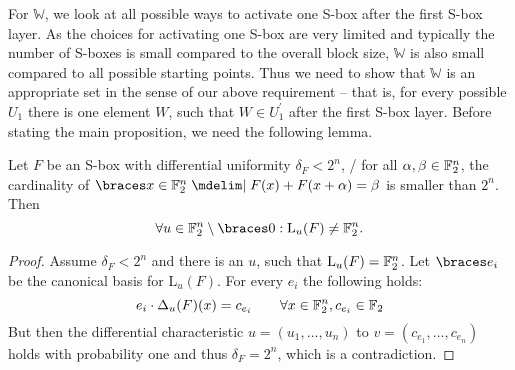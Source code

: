For $\mathbb{W}$, we look at all possible ways to activate one S-box after the first S-box layer.
As the choices for activating one S-box are very limited and typically the number of S-boxes is small compared to the overall block size, $\mathbb{W}$ is also small compared to all possible starting points.
Thus we need to show that $\mathbb{W}$ is an appropriate set in the sense of our above requirement -- that is, for every possible $U_1$ there is one element $W$, such that $W \in U_1^\prime$ after the first S-box layer.
Before stating the main proposition, we need the following lemma.
\begin{lemma}\label{st:lem:ls_dim}
    Let $F$ be an S-box with differential uniformity $\delta_F < 2^n$, \ie/ for all $\alpha, \beta \in \mathbb{F}_2^n$, the cardinality of $\set{x \in \F_2^n \given F(x) + F(x + \alpha) = \beta}$ is smaller than $2^n$.
    Then
    \begin{equation*}
        \forall u \in \F_2^n \setminus \set{0} : \mathrm{L}_u(F) \ne \F_2^n.
    \end{equation*}
\end{lemma}
\begin{proof}
    Assume $\delta_F < 2^n$ and there is an $u$, such that $\mathrm{L}_u(F) = \mathbb{F}_2^n$.
    Let $\set{e_i}$ be the canonical basis for $\mathrm{L}_u(F)$.
    For every $e_i$ the following holds:
    \begin{equation*}
        e_i \cdot \Delta_u(F)(x) = c_{e_i} \qquad \forall x \in \mathbb{F}_2^n, c_{e_i} \in \mathbb{F}_2
    \end{equation*}
    But then the differential characteristic $u = (u_1, \ldots, u_n)$ to $v = (c_{e_1}, \ldots, c_{e_n})$ holds with probability one and thus $\delta_F = 2^n$, which is a contradiction.
\end{proof}

